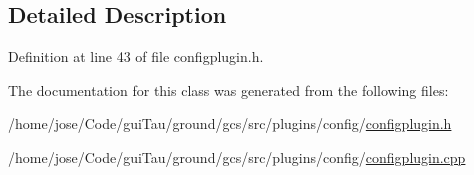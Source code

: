 \subsection{Detailed Description}


Definition at line 43 of file configplugin.\-h.



The documentation for this class was generated from the following files\-:\begin{DoxyCompactItemize}
\item 
/home/jose/\-Code/gui\-Tau/ground/gcs/src/plugins/config/\hyperlink{configplugin_8h}{configplugin.\-h}\item 
/home/jose/\-Code/gui\-Tau/ground/gcs/src/plugins/config/\hyperlink{configplugin_8cpp}{configplugin.\-cpp}\end{DoxyCompactItemize}
